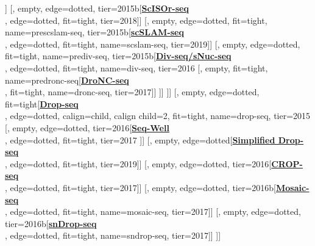 \documentclass[12pt, a4]{article}
\begin{document}
\begin{center}
\begin{forest}
						[, empty, edge=dotted, tier=2015b[\href{https://doi.org/10.1038/ncomms12139}{\textbf{LCM-seq\textsuperscript{\large{\textmu}}}}\\\citealt{nichterwitz2016}, edge=dotted, fit=tight, tier=2016]]
						[, empty, edge=dotted, tier=2015b[\href{https://www.nature.com/articles/nbt.4259}{\textbf{ScISOr-seq}}\\\citealt{gupta2018}, edge=dotted, fit=tight, tier=2018]]
						[, empty, edge=dotted, fit=tight, name=prescslam-seq, tier=2015b[\href{https://www.nature.com/articles/s41586-019-1369-y}{\textbf{scSLAM-seq}}\\\citealt{erhard2019}, edge=dotted, fit=tight, name=scslam-seq, tier=2019]]
						[, empty, edge=dotted, fit=tight, name=prediv-seq, tier=2015b[\href{https://science.sciencemag.org/content/353/6302/925.long}{\textbf{Div-seq/sNuc-seq}}\\\citealt{habib2016}, edge=dotted, fit=tight, name=div-seq, tier=2016
							[, empty, fit=tight, name=predronc-seq[\href{https://www.nature.com/articles/nmeth.4407}{\textbf{DroNC-seq}}\\\citealt{habib2017}, fit=tight, name=dronc-seq, tier=2017]]
						]]
				]]
				[, empty, edge=dotted, fit=tight[\href{https://www.cell.com/abstract/S0092-8674(15)00549-8}{\textbf{Drop-seq}}\\\citealt{macosko2015}, edge=dotted, calign=child, calign child=2, fit=tight, name=drop-seq, tier=2015
					[, empty, edge=dotted, tier=2016[\href{https://www.nature.com/articles/nmeth.4179}{\textbf{Seq-Well}}\\\citealt{gierahn2017}, edge=dotted, fit=tight, tier=2017
					]]
					[, empty, edge=dotted[\href{https://pubs.rsc.org/en/content/articlelanding/2019/lc/c9lc00014c}{\textbf{Simplified Drop-seq}}\\\citealt{biocanin2019}, edge=dotted, fit=tight, tier=2019]]
					[, empty, edge=dotted, tier=2016[\href{https://www.nature.com/articles/nmeth.4177}{\textbf{CROP-seq}}\\\citealt{datlinger2017}, edge=dotted, fit=tight, tier=2017]]
					[, empty, edge=dotted, tier=2016b[\href{https://www.sciencedirect.com/science/article/pii/S1097276517301740}{\textbf{Mosaic-seq}}\\\citealt{xie2017}, edge=dotted, fit=tight, name=mosaic-seq, tier=2017]]
					[, empty, edge=dotted, tier=2016b[\href{https://www.nature.com/articles/nbt.4038}{\textbf{snDrop-seq}}\\\citealt{lake2017a}, edge=dotted, fit=tight, name=sndrop-seq, tier=2017]]
				]]

\end{forest}
\end{center}
\end{document}
